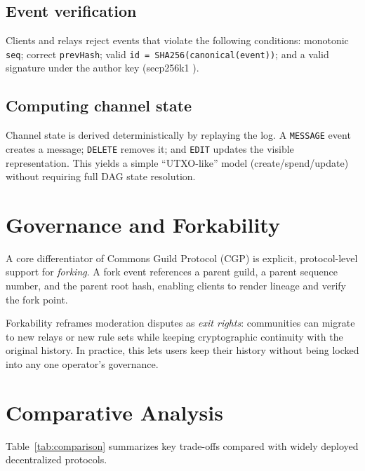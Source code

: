 \documentclass[conference]{IEEEtran}
\newcommand{\cgp}{Commons Guild Protocol (CGP)\xspace}
\begin{document}
\subsection{Event verification}
Clients and relays reject events that violate the following conditions: monotonic \texttt{seq}; correct \texttt{prevHash}; valid \texttt{id = SHA256(canonical(event))}; and a valid signature under the author key (secp256k1 \cite{sec2}).

\subsection{Computing channel state}
Channel state is derived deterministically by replaying the log. A \texttt{MESSAGE} event creates a message; \texttt{DELETE} removes it; and \texttt{EDIT} updates the visible representation. This yields a simple ``UTXO-like'' model (create/spend/update) without requiring full DAG state resolution.

\section{Governance and Forkability}
A core differentiator of \cgp is explicit, protocol-level support for \emph{forking}. A fork event references a parent guild, a parent sequence number, and the parent root hash, enabling clients to render lineage and verify the fork point.

Forkability reframes moderation disputes as \emph{exit rights}: communities can migrate to new relays or new rule sets while keeping cryptographic continuity with the original history. In practice, this lets users keep their history without being locked into any one operator’s governance.

\section{Comparative Analysis}
Table~\ref{tab:comparison} summarizes key trade-offs compared with widely deployed decentralized protocols.
\end{document}
